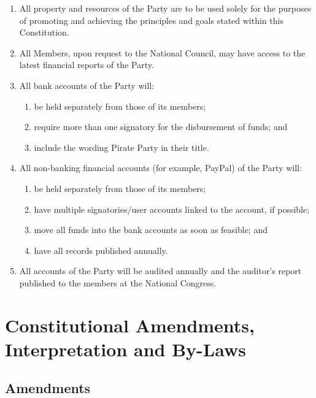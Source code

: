 \documentclass[a4paper,titlepage,8.5pt]{article}
\begin{document}
\begin{enumerate}
\item All property and resources of the Party are to be used solely for the purposes of promoting and achieving the principles and goals stated within this Constitution.
\item All Members, upon request to the National Council, may have access to the latest financial reports of the Party.
\item All bank accounts of the Party will:
\begin{enumerate}
\item be held separately from those of its members;
\item require more than one signatory for the disbursement of funds; and
\item include the wording Pirate Party in their title.
\end{enumerate}
\item All non-banking financial accounts (for example, PayPal) of the Party will:
\begin{enumerate}
\item be held separately from those of its members;
\item have multiple signatories/user accounts linked to the account, if possible;
\item move all funds into the bank accounts as soon as feasible; and
\item have all records published annually.
\end{enumerate}
\item All accounts of the Party will be audited annually and the auditor’s report published to the members at the National Congress.
\end{enumerate}

\section{Constitutional Amendments, Interpretation and By-Laws}

\subsection{Amendments}
\end{document}
